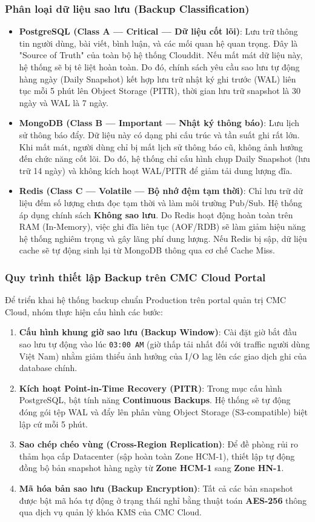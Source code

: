 \documentclass[12pt, a4paper]{article}
\begin{document}
\subsubsection{Phân loại dữ liệu sao lưu (Backup Classification)}
\begin{itemize}
    \item \textbf{PostgreSQL (Class A — Critical — Dữ liệu cốt lõi)}: Lưu trữ thông tin người dùng, bài viết, bình luận, và các mối quan hệ quan trọng. Đây là "Source of Truth" của toàn bộ hệ thống Clouddit. Nếu mất mát dữ liệu này, hệ thống sẽ bị tê liệt hoàn toàn. Do đó, chính sách yêu cầu sao lưu tự động hàng ngày (Daily Snapshot) kết hợp lưu trữ nhật ký ghi trước (WAL) liên tục mỗi 5 phút lên Object Storage (PITR), thời gian lưu trữ snapshot là 30 ngày và WAL là 7 ngày.
    \item \textbf{MongoDB (Class B — Important — Nhật ký thông báo)}: Lưu lịch sử thông báo đẩy. Dữ liệu này có dạng phi cấu trúc và tần suất ghi rất lớn. Khi mất mát, người dùng chỉ bị mất lịch sử thông báo cũ, không ảnh hưởng đến chức năng cốt lõi. Do đó, hệ thống chỉ cấu hình chụp Daily Snapshot (lưu trữ 14 ngày) và không kích hoạt WAL/PITR để giảm tải dung lượng đĩa.
    \item \textbf{Redis (Class C — Volatile — Bộ nhớ đệm tạm thời)}: Chỉ lưu trữ dữ liệu đếm số lượng chưa đọc tạm thời và làm môi trường Pub/Sub. Hệ thống áp dụng chính sách \textbf{Không sao lưu}. Do Redis hoạt động hoàn toàn trên RAM (In-Memory), việc ghi đĩa liên tục (AOF/RDB) sẽ làm giảm hiệu năng hệ thống nghiêm trọng và gây lãng phí dung lượng. Nếu Redis bị sập, dữ liệu cache sẽ tự động sinh lại từ MongoDB thông qua cơ chế Cache Miss.
\end{itemize}

\subsubsection{Quy trình thiết lập Backup trên CMC Cloud Portal}
Để triển khai hệ thống backup chuẩn Production trên portal quản trị CMC Cloud, nhóm thực hiện cấu hình các bước:
\begin{enumerate}
    \item \textbf{Cấu hình khung giờ sao lưu (Backup Window)}: Cài đặt giờ bắt đầu sao lưu tự động vào lúc \texttt{03:00 AM} (giờ thấp tải nhất đối với traffic người dùng Việt Nam) nhằm giảm thiểu ảnh hưởng của I/O lag lên các giao dịch ghi của database chính.
    \item \textbf{Kích hoạt Point-in-Time Recovery (PITR)}: Trong mục cấu hình PostgreSQL, bật tính năng \textbf{Continuous Backups}. Hệ thống sẽ tự động đóng gói tệp WAL và đẩy lên phân vùng Object Storage (S3-compatible) biệt lập cứ mỗi 5 phút.
    \item \textbf{Sao chép chéo vùng (Cross-Region Replication)}: Để đề phòng rủi ro thảm họa cấp Datacenter (sập hoàn toàn Zone HCM-1), thiết lập tự động đồng bộ bản snapshot hàng ngày từ \textbf{Zone HCM-1} sang \textbf{Zone HN-1}.
    \item \textbf{Mã hóa bản sao lưu (Backup Encryption)}: Tất cả các bản snapshot được bật mã hóa tự động ở trạng thái nghỉ bằng thuật toán \textbf{AES-256} thông qua dịch vụ quản lý khóa KMS của CMC Cloud.
\end{enumerate}
\end{document}
